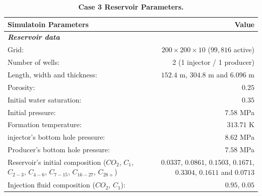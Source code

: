 \FloatBarrier
\begin{center}
\begin{table}[h!]
\begin{adjustbox}{width=\textwidth}
    \begin{threeparttable}
    \caption{\textbf{Case 3 Reservoir Parameters\supercite{fernandes}.}}
    \label{case1}
        \begin{tabular}{l r }
            \toprule
            Simulatoin Parameters & Value\\
            \midrule
	\rowcolor{red!20}\textit{\textbf{Reservoir data}}      & \\
	Grid:      &           $200\times200\times10$ ($99,816$ active) \\
	\rowcolor{blue!5}Number of wells:      &  2 (1 injector / 1 producer) \\
	Length, width and thickness:      & $152.4$ m, $304.8$ m and $6.096$ m\\
	\rowcolor{blue!5}Porosity:       &          $0.25$ \\
	Initial water saturation:    & $0.35$ \\      
	\rowcolor{blue!5}Initial pressure:    &      $7.58$ MPa\\
	Formation temperature:    & $313.71$ K     \\
	injector's bottom hole pressure:    &       $8.62$ MPa \\
	\rowcolor{blue!5}Producer’s bottom hole pressure:    &       $7.58$ MPa\\
	Reservoir’s initial composition ($CO_{2}$, $C_{1}$, $C_{2-3}$, $C_{4-6}$, $C_{7-15}$, $C_{16-27}$, $C_{28+}$) & $0.0337$, $0.0861$, $0.1503$, $0.1671$, $0.3304$, $0.1611$ and $0.0713$\\
	\rowcolor{blue!5}Injection ﬂuid composition ($CO_{2}$, $C_{1}$):    &   $0.95$, $0.05$\\
        \bottomrule
        \end{tabular}
    \end{threeparttable}
\end{adjustbox}    
\end{table}
\end{center}
\FloatBarrier
